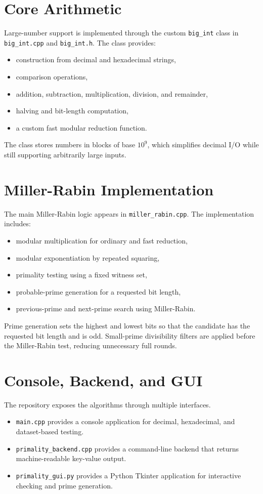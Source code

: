 \documentclass[12pt,a4paper]{report}
\begin{document}
\section{Core Arithmetic}
Large-number support is implemented through the custom \texttt{big\_int} class in \texttt{big\_int.cpp} and \texttt{big\_int.h}. The class provides:
\begin{itemize}
    \item construction from decimal and hexadecimal strings,
    \item comparison operations,
    \item addition, subtraction, multiplication, division, and remainder,
    \item halving and bit-length computation,
    \item a custom fast modular reduction function.
\end{itemize}

The class stores numbers in blocks of base \(10^9\), which simplifies decimal I/O while still supporting arbitrarily large inputs.

\section{Miller-Rabin Implementation}
The main Miller-Rabin logic appears in \texttt{miller\_rabin.cpp}. The implementation includes:
\begin{itemize}
    \item modular multiplication for ordinary and fast reduction,
    \item modular exponentiation by repeated squaring,
    \item primality testing using a fixed witness set,
    \item probable-prime generation for a requested bit length,
    \item previous-prime and next-prime search using Miller-Rabin.
\end{itemize}

Prime generation sets the highest and lowest bits so that the candidate has the requested bit length and is odd. Small-prime divisibility filters are applied before the Miller-Rabin test, reducing unnecessary full rounds.

\section{Console, Backend, and GUI}
The repository exposes the algorithms through multiple interfaces.
\begin{itemize}
    \item \texttt{main.cpp} provides a console application for decimal, hexadecimal, and dataset-based testing.
    \item \texttt{primality\_backend.cpp} provides a command-line backend that returns machine-readable key-value output.
    \item \texttt{primality\_gui.py} provides a Python Tkinter application for interactive checking and prime generation.
\end{itemize}
\end{document}
